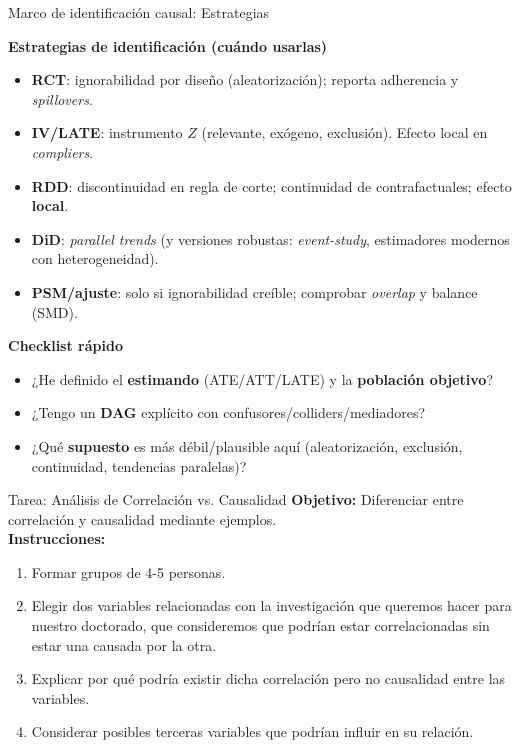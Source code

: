﻿\documentclass{beamer}
\begin{document}
\begin{frame}{Marco de identificación causal: Estrategias}
\small

\textbf{Estrategias de identificación (cuándo usarlas)}
\begin{itemize}
  \item \textbf{RCT}: ignorabilidad por diseño (aleatorización); reporta adherencia y \textit{spillovers}.
  \item \textbf{IV/LATE}: instrumento $Z$ (relevante, exógeno, exclusión). Efecto local en \textit{compliers}.
  \item \textbf{RDD}: discontinuidad en regla de corte; continuidad de contrafactuales; efecto \textbf{local}.
  \item \textbf{DiD}: \textit{parallel trends} (y versiones robustas: \textit{event-study}, estimadores modernos con heterogeneidad).
  \item \textbf{PSM/ajuste}: solo si ignorabilidad creíble; comprobar \textit{overlap} y balance (SMD).
\end{itemize}

\textbf{Checklist rápido}
\begin{itemize}
  \item ¿He definido el \textbf{estimando} (ATE/ATT/LATE) y la \textbf{población objetivo}? 
  \item ¿Tengo un \textbf{DAG} explícito con confusores/colliders/mediadores?
  \item ¿Qué \textbf{supuesto} es más débil/plausible aquí (aleatorización, exclusión, continuidad, tendencias paralelas)?
\end{itemize}
\end{frame}


\begin{frame}{Tarea: Análisis de Correlación vs. Causalidad}
    \textbf{Objetivo:} Diferenciar entre correlación y causalidad mediante ejemplos.\\[10pt]
    \textbf{Instrucciones:}
    \begin{enumerate}
        \item Formar grupos de 4-5 personas.
        \item Elegir dos variables relacionadas con la investigación que queremos hacer para nuestro doctorado, que consideremos que podrían estar correlacionadas sin estar una causada por la otra.
        \item Explicar por qué podría existir dicha correlación pero no causalidad entre las variables.
        \item Considerar posibles terceras variables que podrían influir en su relación.
    \end{enumerate}
\end{frame}
\end{document}
